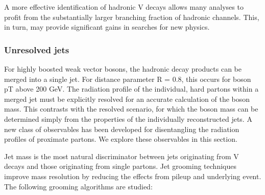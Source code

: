 A more effective identification of hadronic V decays allows many analyses to profit from the substantially larger branching fraction of hadronic channels. This, in turn, may provide significant gains in searches for new physics.

\subsubsection{Unresolved jets}

For highly boosted weak vector bosons, the hadronic decay products can be merged into a single jet. For distance parameter R = 0.8, this occurs for boson pT above 200 GeV. The radiation profile of the individual, hard partons within a merged jet must be explicitly resolved for an accurate calculation of the boson mass. This contrasts with the resolved scenario, for which the boson mass can be determined simply from the properties of the individually reconstructed jets. A new class of observables has been developed for disentangling the radiation profiles of proximate partons. We explore these observables in this section.

Jet mass is the most natural discriminator between jets originating from V decays and those originating from single partons. Jet grooming techniques improve mass resolution by reducing the effects from pileup and underlying event. The following grooming algorithms are studied:

